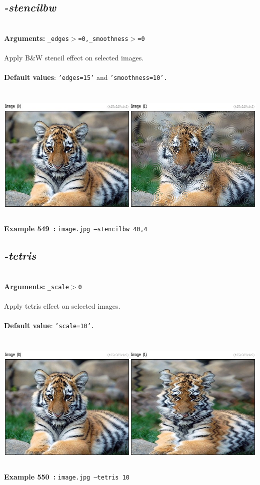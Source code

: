 \documentclass[a4paper,11pt,twoside]{book}
\begin{document}
\subsection{\emph{-stencilbw} }\vspace*{-0.5em}
~\\\textbf{Arguments: } 
{\small \texttt{\_edges$>$=0,\_smoothness$>$=0}}\\~\\
Apply B\&W stencil effect on selected images.
~\\~\\\textbf{Default values}: {\small \texttt{'edges=15'} and \texttt{'smoothness=10'.}}
\begin{center}\includegraphics[keepaspectratio=true,height=7cm,width=\textwidth]{img/gmic_def549.jpg}\\
{\footnotesize \textbf{Example 549~:} \texttt{image.jpg --stencilbw 40,4}}
\end{center}

\subsection{\emph{-tetris} }\vspace*{-0.5em}
~\\\textbf{Arguments: } 
{\small \texttt{\_scale$>$0}}\\~\\
Apply tetris effect on selected images.
~\\~\\\textbf{Default value}: {\small \texttt{'scale=10'.}}
\begin{center}\includegraphics[keepaspectratio=true,height=7cm,width=\textwidth]{img/gmic_def550.jpg}\\
{\footnotesize \textbf{Example 550~:} \texttt{image.jpg --tetris 10}}
\end{center}
\end{document}
